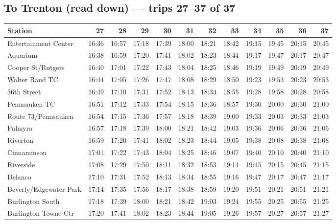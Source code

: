 \subsection*{To Trenton (read down) --- trips 27--37 of 37}
\begin{center}\footnotesize\setlength{\tabcolsep}{3pt}\begin{tabular}{@{}lrrrrrrrrrrr@{}}\toprule
Station & 27 & 28 & 29 & 30 & 31 & 32 & 33 & 34 & 35 & 36 & 37 \\\midrule
Entertainment Center & 16:36 & 16:57 & 17:18 & 17:39 & 18:00 & 18:21 & 18:42 & 19:15 & 19:45 & 20:15 & 20:45 \\
Aquarium & 16:38 & 16:59 & 17:20 & 17:41 & 18:02 & 18:23 & 18:44 & 19:17 & 19:47 & 20:17 & 20:47 \\
Cooper St/Rutgers & 16:40 & 17:01 & 17:22 & 17:43 & 18:04 & 18:25 & 18:46 & 19:19 & 19:49 & 20:19 & 20:49 \\
Walter Rand TC & 16:44 & 17:05 & 17:26 & 17:47 & 18:08 & 18:29 & 18:50 & 19:23 & 19:53 & 20:23 & 20:53 \\
36th Street & 16:49 & 17:10 & 17:31 & 17:52 & 18:13 & 18:34 & 18:55 & 19:28 & 19:58 & 20:28 & 20:58 \\
Pennsauken TC & 16:51 & 17:12 & 17:33 & 17:54 & 18:15 & 18:36 & 18:57 & 19:30 & 20:00 & 20:30 & 21:00 \\
Route 73/Pennsauken & 16:54 & 17:15 & 17:36 & 17:57 & 18:18 & 18:39 & 19:00 & 19:33 & 20:03 & 20:33 & 21:03 \\
Palmyra & 16:57 & 17:18 & 17:39 & 18:00 & 18:21 & 18:42 & 19:03 & 19:36 & 20:06 & 20:36 & 21:06 \\
Riverton & 16:59 & 17:20 & 17:41 & 18:02 & 18:23 & 18:44 & 19:05 & 19:38 & 20:08 & 20:38 & 21:08 \\
Cinnaminson & 17:01 & 17:22 & 17:43 & 18:04 & 18:25 & 18:46 & 19:07 & 19:40 & 20:10 & 20:40 & 21:10 \\
Riverside & 17:08 & 17:29 & 17:50 & 18:11 & 18:32 & 18:53 & 19:14 & 19:45 & 20:15 & 20:45 & 21:15 \\
Delanco & 17:10 & 17:31 & 17:52 & 18:13 & 18:34 & 18:55 & 19:16 & 19:47 & 20:17 & 20:47 & 21:17 \\
Beverly/Edgewater Park & 17:14 & 17:35 & 17:56 & 18:17 & 18:38 & 18:59 & 19:20 & 19:51 & 20:21 & 20:51 & 21:21 \\
Burlington South & 17:18 & 17:39 & 18:00 & 18:21 & 18:42 & 19:03 & 19:24 & 19:55 & 20:25 & 20:55 & 21:25 \\
Burlington Towne Ctr & 17:20 & 17:41 & 18:02 & 18:23 & 18:44 & 19:05 & 19:26 & 19:57 & 20:27 & 20:57 & 21:27 \\

\end{tabular}
\end{center}

